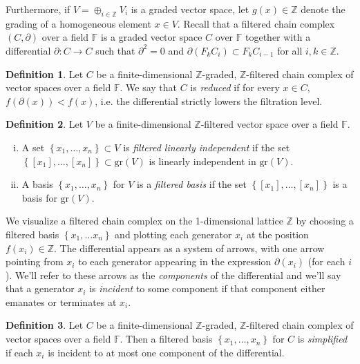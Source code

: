 \documentclass[11pt]{article}
\theoremstyle{plain} \newtheorem{thm}{Theorem}[subsection]
\theoremstyle{plain} \newtheorem{cor}[thm]{Corollary}
\theoremstyle{plain} \newtheorem{prop}[thm]{Proposition}
\theoremstyle{plain} \newtheorem{conj}[thm]{Conjecture}
\theoremstyle{plain} \newtheorem{lem}[thm]{Lemma}
\theoremstyle{definition} \newtheorem{df}[thm]{Definition}
\theoremstyle{remark} \newtheorem{rmk}[thm]{Remark}
\theoremstyle{remark} \newtheorem{obs}[thm]{Observation}
\numberwithin{equation}{section}
\begin{document}
Furthermore, if $V = \oplus_{i \in \mathbb{Z}} V_i$ is a graded vector space, let $g(x) \in \mathbb{Z}$ denote the grading of a homogeneous element $x \in V$.  Recall that a filtered chain complex $(C, \partial)$ over a field $\mathbb{F}$ is a graded vector space $C$ over $\mathbb{F}$ together with a differential $\partial: C \rightarrow C$ such that $\partial^2 = 0$ and $\partial(F_k C_i) \subset F_k C_{i-1}$ for all $i, k \in \mathbb{Z}$.

\begin{df}
Let $C$ be a finite-dimensional $\mathbb{Z}$-graded, $\mathbb{Z}$-filtered chain complex of vector spaces over a field $\mathbb{F}$.  We say that $C$ is \emph{reduced} if for every $x \in C$, $f(\partial(x)) < f(x)$, i.e. the differential strictly lowers the filtration level.
\end{df}

\begin{df}
Let $V$ be a finite-dimensional $\mathbb{Z}$-filtered vector space over a field $\mathbb{F}$.
\begin{enumerate}[(i)]
\item A set $\left\{ x_1, \ldots, x_n \right\} \subset V$ is \emph{filtered linearly independent} if the set $\left\{ [x_1], \ldots, [x_n]\right\} \subset \text{gr}(V)$ is linearly independent in $\text{gr}(V)$.
\item A basis $\left\{ x_1, \ldots, x_n \right\}$ for $V$ is a \emph{filtered basis} if the set $\left\{ [x_1], \ldots, [x_n] \right\}$ is a basis for $\text{gr}(V)$.
\end{enumerate}
\end{df}

We visualize a filtered chain complex on the 1-dimensional lattice $\mathbb{Z}$ by choosing a filtered basis $\left\{x_1, \ldots x_n \right\}$ and plotting each generator $x_i$ at the position $f(x_i) \in \mathbb{Z}$.  The differential appears as a system of arrows, with one arrow pointing from $x_i$ to each generator appearing in the expression $\partial(x_i)$ (for each $i$).  We'll refer to these arrows as the \emph{components} of the differential and we'll say that a generator $x_i$ is \emph{incident} to some component if that component either emanates or terminates at $x_i$.

\begin{df}
Let $C$ be a finite-dimensional $\mathbb{Z}$-graded, $\mathbb{Z}$-filtered chain complex of vector spaces over a field $\mathbb{F}$.  Then a filtered basis $\left\{ x_1, \ldots, x_n \right\}$ for $C$ is \emph{simplified} if each $x_i$ is incident to at most one component of the differential.
\end{df}
\end{document}
